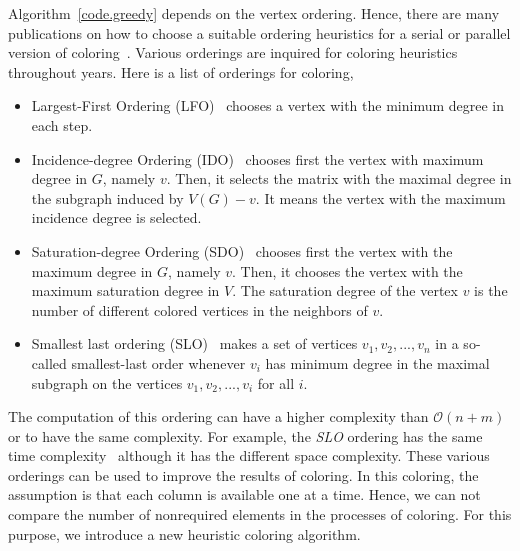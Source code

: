 \documentclass[12pt, twoside]{book}
\newcommand{\coderef}[1]{Algorithm~\protect\ref{#1}}
\begin{document}
\coderef{code.greedy} depends on the vertex ordering.
Hence, there are many publications on how to choose a suitable ordering heuristics for a serial or parallel version of coloring~\cite{ordering1,ordering2,ordering3}.
Various orderings are inquired for coloring heuristics
throughout years. Here is a list of orderings for coloring,
\begin{itemize}
\item Largest-First Ordering (LFO)~\cite{LFO} chooses a vertex with the minimum degree in each step.
\item Incidence-degree Ordering (IDO)~\cite{IDO} chooses first the vertex with maximum degree in $G$, namely $v$. Then, it selects the matrix with the maximal degree in the subgraph induced by $V(G)-v$. It means the vertex with the maximum incidence degree is selected.
\item Saturation-degree Ordering (SDO)~\cite{SDO} chooses first the vertex with the maximum degree in $G$, namely $v$. Then, it chooses the vertex with the maximum saturation degree in
$V$. The saturation degree of the vertex $v$ is the number of different colored vertices in the neighbors of $v$.
\item Smallest last ordering (SLO)~\cite{ordering1} makes a set of vertices ${v_1,v_2,...,v_n}$ in a so-called smallest-last
order whenever $v_i$ has minimum degree in the maximal subgraph on the vertices $v_1,v_2,...,v_i$ for all $i$.
\end{itemize}
The computation of this ordering can have a higher complexity than $\mathcal{O}(n+m)$ or to have the same complexity. For example, the \textit{SLO} ordering has the same time complexity~\cite{ordering1} although it has the different space complexity.
These various orderings can be used to improve the results of coloring.
In this coloring, the assumption is that each column is available one at a time. Hence, we can not compare the number of nonrequired elements in the processes of coloring. For this purpose, we introduce a new heuristic coloring algorithm.
\end{document}
